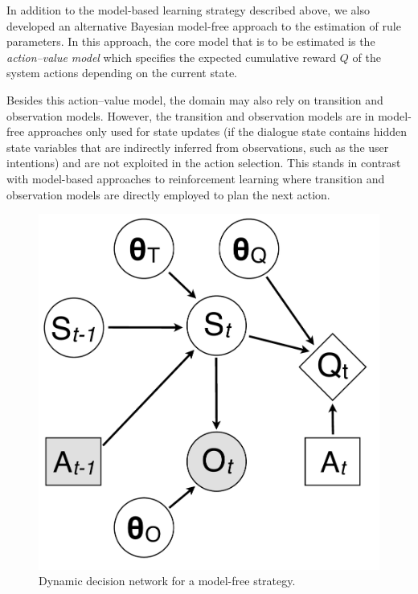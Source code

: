 In addition to the model-based learning strategy described above, we also developed an alternative Bayesian model-free approach to the estimation of rule parameters.  In this approach, the core model that is to be estimated is the \textit{action--value model} which specifies the expected cumulative reward $Q$ of the system actions depending on the current state. 

Besides this action--value model, the domain may also rely on transition and observation models. However, the transition and observation models are in model-free approaches only used for state updates (if the dialogue state contains hidden state variables that are indirectly inferred from observations, such as the user intentions) and are not exploited in the action selection.  This stands in contrast with model-based approaches to reinforcement learning where transition and observation  models are directly employed to plan the next action.

\begin{figure}
\vspace{-2mm}
\centering
\includegraphics[scale=0.25]{imgs/modelfreediagram.pdf}
\vspace{-2mm}
\caption{Dynamic decision network for a model-free strategy.}
\label{fig:modelfreediagram}
\end{figure}

